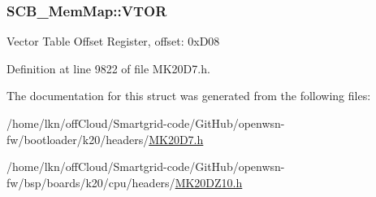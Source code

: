 \subsubsection[{\texorpdfstring{V\+T\+OR}{VTOR}}]{ S\+C\+B\+\_\+\+Mem\+Map\+::\+V\+T\+OR}\hypertarget{struct_s_c_b___mem_map_aa327db1d9948595498fba43acc8d336b}{}\label{struct_s_c_b___mem_map_aa327db1d9948595498fba43acc8d336b}
Vector Table Offset Register, offset\+: 0x\+D08 

Definition at line 9822 of file M\+K20\+D7.\+h.



The documentation for this struct was generated from the following files\+:\begin{DoxyCompactItemize}
\item 
/home/lkn/off\+Cloud/\+Smartgrid-\/code/\+Git\+Hub/openwsn-\/fw/bootloader/k20/headers/\hyperlink{bootloader_2k20_2headers_2_m_k20_d7_8h}{M\+K20\+D7.\+h}\item 
/home/lkn/off\+Cloud/\+Smartgrid-\/code/\+Git\+Hub/openwsn-\/fw/bsp/boards/k20/cpu/headers/\hyperlink{_m_k20_d_z10_8h}{M\+K20\+D\+Z10.\+h}\end{DoxyCompactItemize}
